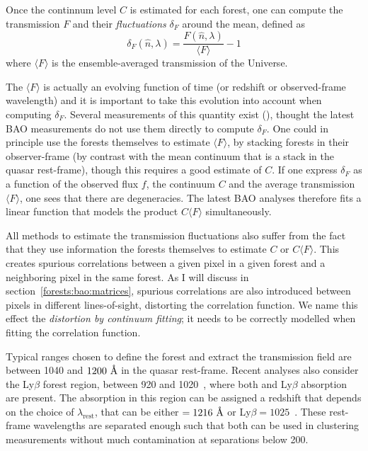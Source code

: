 Once the continnum level $C$ is estimated for each forest, one can compute 
the transmission $F$ and their \emph{fluctuations} $\delta_F$ around the mean,
defined as 
\begin{equation}
\delta_F(\hat{n}, \lambda) = \frac{F(\hat{n}, \lambda)}{\langle F \rangle} - 1
\label{eq:delta_transmission}
\end{equation}
where $\langle F \rangle$ is the ensemble-averaged transmission of the Universe. 

The $\langle F \rangle$ is actually an evolving function of time (or redshift or observed-frame 
wavelength) and it is important to take this evolution into account when computing 
$\delta_F$. 
Several measurements of this quantity exist 
(\cite{faucher-giguereDirectPrecisionMeasurement2008,
parisPrincipalComponentAnalysis2011,
beckerRefinedMeasurementMean2013,
kambleMeasurementsEffectiveOptical2020}), thought the latest BAO measurements do not 
use them directly to compute $\delta_F$. One could in principle use the forests themselves
to estimate $\langle F \rangle$, by stacking forests in their observer-frame 
(by contrast with the mean continuum that is a stack in the quasar rest-frame), 
though this requires a good estimate of $C$. 
If one express $\delta_F$ as a function of 
the observed flux $f$, the continuum $C$ and the average transmission $\langle F \rangle$,
one sees that there are degeneracies. 
The latest BAO analyses therefore fits a linear function 
that models the product $C \langle F \rangle$ simultaneously. 

All methods to estimate the transmission fluctuations also suffer from the fact 
that they use information the forests themselves to estimate $C$ or $C \langle F \rangle$.
This creates spurious correlations between a given pixel in a given forest and a neighboring 
pixel in the same forest. As I will discuss in section~\ref{forests:bao:matrices},
spurious correlations are also introduced between pixels in different lines-of-sight, 
distorting the correlation function. We name this effect the \emph{distortion
by continuum fitting}; it needs to be correctly modelled when fitting the 
correlation function.

Typical ranges chosen to define the \lya forest and extract the transmission field
are between 1040 and $1200~\angstrom$ in the quasar rest-frame. Recent analyses also 
consider the Ly$\beta$ forest region, between 920 and 1020~\angstrom, 
where both \lya and Ly$\beta$ absorption are present. The absorption in this region 
can be assigned a redshift that depends on the choice of $\lambda_\mathrm{rest}$, 
that can be either \lya$ = 1216~\angstrom$  or Ly$\beta = 1025$~\angstrom. 
These rest-frame wavelengths are separated enough such that both can be used 
in clustering measurements without much contamination at separations below 200\hmpc.

